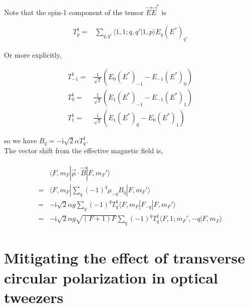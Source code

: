 \documentclass[10pt,fleqn]{article}
\newcommand{\ui}{\mathrm{i}}
\newcommand{\eqar}[1]
{
  \begin{align}
    #1
  \end{align}
}
\newcommand{\paren}[1]{{\left({#1}\right)}}
\begin{document}
Note that the spin-1 component of the tensor $\vec E\vec E^*$ is
\eqar{
  T^1_p=&\sum_{q,q'}\langle 1,1;q,q'|1,p\rangle E_{q}(E^*)_{q'}
}
Or more explicitly,
\eqar{
  T^1_{-1}=&\frac{1}{\sqrt{2}}\paren{E_{0}(E^*)_{-1}-E_{-1}(E^*)_{0}}\\
  T^1_{0}=&\frac{1}{\sqrt{2}}\paren{E_{1}(E^*)_{-1}-E_{-1}(E^*)_{1}}\\
  T^1_{1}=&\frac{1}{\sqrt{2}}\paren{E_{1}(E^*)_{0}-E_{0}(E^*)_{1}}
}
so we have $B_q=-\ui\sqrt2\alpha T^1_{q}$.\\

The vector shift from the effective magnetic field is,
\eqar{
  \begin{split}
    &\langle F,m_F|\vec\mu\cdot\vec B|F,m_F'\rangle\\
    =&\langle F,m_F|\sum_{q}(-1)^q\mu_{-q}B_{q}|F,m_F'\rangle\\
    =&-\ui\sqrt2\alpha g\sum_{q}(-1)^qT^1_{q}\langle F,m_F|F_{-q}|F,m_F'\rangle\\
    =&-\ui\sqrt2\alpha g\sqrt{(F+1)F}\sum_{q}(-1)^qT^1_{q}\langle F,1;m_F',-q|F,m_F\rangle
  \end{split}
}

\section{Mitigating the effect of transverse circular polarization in optical tweezers}

\end{document}
